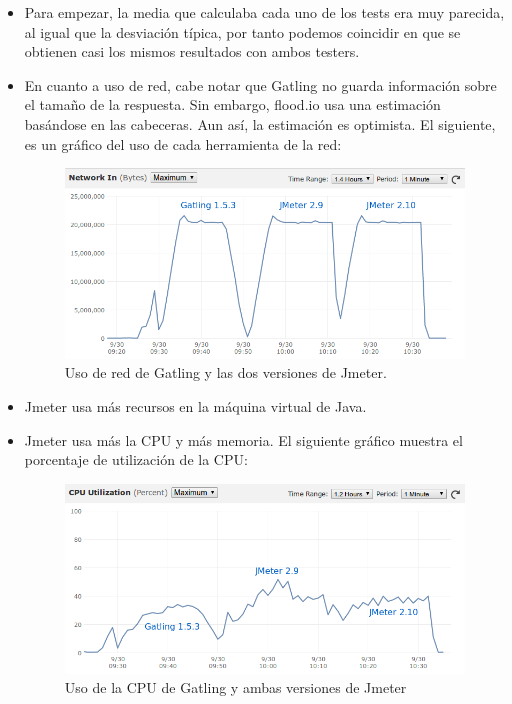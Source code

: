 \begin{itemize}
	\begin{itemize}
		\item Para empezar, la media que calculaba cada uno de los tests era muy parecida, al igual que la desviación típica, por tanto podemos coincidir en que se obtienen casi los mismos resultados con ambos testers.
		\item En cuanto a uso de red, cabe notar que Gatling no guarda información sobre el tamaño de la respuesta. Sin embargo, flood.io usa una estimación basándose en las cabeceras. Aun así, la estimación es optimista. El siguiente, es un gráfico del uso de cada herramienta de la red:\\
		\begin{figure}[H]
			\centering
			\includegraphics[width=0.7\linewidth]{Gatling-Jmeter-Net}
			\caption[Uso de red]{Uso de red de Gatling y las dos versiones de Jmeter.}
			\label{fig:Gatling-Jmeter-Net}
		\end{figure}

		\item Jmeter usa más recursos en la máquina virtual de Java.
		
		\item Jmeter usa más la CPU y más memoria. El siguiente gráfico muestra el porcentaje de utilización de la CPU:\\
		\begin{figure}[H]
			\centering
			\includegraphics[width=0.7\linewidth]{UsoCPU-JmeterGatling}
			\caption[Uso CPU]{Uso de la CPU de Gatling y ambas versiones de Jmeter}
			\label{fig:UsoCPU-JmeterGatling}
		\end{figure}


\end{itemize}
\end{itemize}
